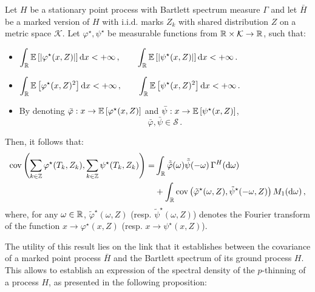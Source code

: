 \begin{theorem}\label{th:chap5_spectral_marked}
    Let $H$ be a stationary point process with Bartlett spectrum measure $\Gamma$ and 
    let $\bar H$ be a marked version of $H$ with i.i.d. marks $Z_k$ with shared distribution $Z$ on a metric space $\mathcal{K}$.
    Let $\varphi^\star, \psi^\star$ be measurable functions from ${\mathbb R} \times \mathcal{K} \to {\mathbb R}$, 
    such that:
    \begin{itemize}
        \item $\displaystyle
            \int_{{\mathbb R}}{{\mathbb E}\left[|\varphi^\star(x, Z)|\right]{\mathrm{d}} x} < +\infty\,,\qquad \int_{{\mathbb R}}{{\mathbb E}\left[|\psi^\star(x, Z)|\right]{\mathrm{d}} x} < +\infty\,.
        $
        \item $\displaystyle
            \int_{{\mathbb R}}{{\mathbb E}\left[\varphi^\star(x, Z)^2\right]{\mathrm{d}} x} < +\infty\,,\qquad\int_{{\mathbb R}}{{\mathbb E}\left[\psi^\star(x, Z)^2\right]{\mathrm{d}} x} < +\infty\,.
        $
        \item By denoting $\bar \varphi : x\to {\mathbb E}\left[\varphi^\star(x, Z)\right]$ and $\bar \psi : x\to {\mathbb E}\left[\psi^\star(x, Z)\right]$,
              \[\bar \varphi,\bar \psi \in\mathcal{S}\,.\]
    \end{itemize}

    Then, it follows that:
    \begin{align}\label{eq:chap5_marked_spectrum}
        \operatorname{cov}\left(\sum_{k\in{\mathbb Z}}{\varphi^\star(T_k, Z_k)}, \sum_{k\in{\mathbb Z}}{\psi^\star(T_k, Z_k)}\right) =& 
        \int_{{\mathbb R}}{\tilde {\bar\varphi} (\omega) \tilde{\bar \psi} (-\omega)\,\Gamma^H({\mathrm{d}} \omega)} \\
        &+ \int_{{\mathbb R}}{\operatorname{cov}\left( \tilde \varphi^\star(\omega, Z), \tilde \psi^\star (-\omega, Z)\right)M_1({\mathrm{d}} \omega)}\nonumber\,,
    \end{align}
    where, for any $\omega\in{\mathbb R}$, $\tilde \varphi^\star(\omega, Z)$ (resp. $\tilde \psi^\star(\omega, Z)$) denotes the Fourier transform of the function $x\to \varphi^\star(x, Z)$ (resp. $x\to \psi^\star(x, Z)$).
\end{theorem}

The utility of this result lies on the link that it establishes between the covariance of a marked point process $\bar H$
and the Bartlett spectrum of its ground process $H$. 
This allows to establish an expression of the spectral density of the $p$-thinning of a process $H$, 
as presented in the following proposition:

